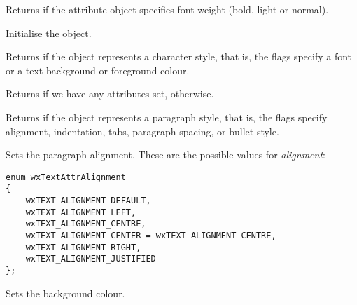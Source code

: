 Returns \true if the attribute object specifies font weight (bold, light or normal).

\label{wxrichtextattrinit}


Initialise the object.

\label{wxrichtextattrischaracterstyle}


Returns \true if the object represents a character style, that is,
the flags specify a font or a text background or foreground colour.

\label{wxrichtextattrisdefault}


Returns \false if we have any attributes set, \true otherwise.

\label{wxrichtextattrisparagraphstyle}


Returns \true if the object represents a paragraph style, that is,
the flags specify alignment, indentation, tabs, paragraph spacing, or
bullet style.

\label{wxrichtextattrsetalignment}


Sets the paragraph alignment. These are the possible values for {\it alignment}:

{\small
\begin{verbatim}
enum wxTextAttrAlignment
{
    wxTEXT_ALIGNMENT_DEFAULT,
    wxTEXT_ALIGNMENT_LEFT,
    wxTEXT_ALIGNMENT_CENTRE,
    wxTEXT_ALIGNMENT_CENTER = wxTEXT_ALIGNMENT_CENTRE,
    wxTEXT_ALIGNMENT_RIGHT,
    wxTEXT_ALIGNMENT_JUSTIFIED
};
\end{verbatim}
}

\label{wxrichtextattrsetbackgroundcolour}


Sets the background colour.

\label{wxrichtextattrsetbulletfont}

